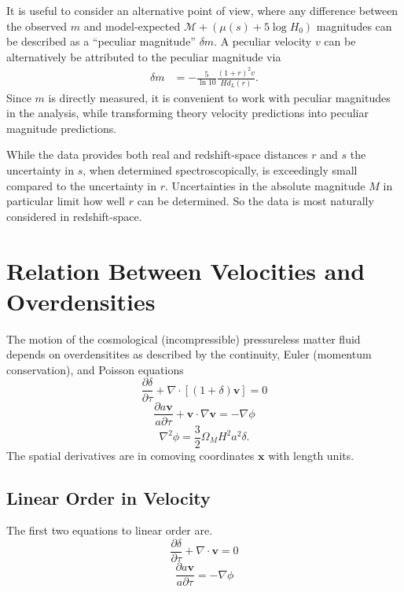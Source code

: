 \documentclass[11pt, oneside]{article}   	%
\begin{document}
It is useful to consider an alternative point of view, where 
any difference between the observed $m$ and model-expected $\mathcal{M} + (\mu(s)+5\log{H_0})$ magnitudes
can be described as
a ``peculiar magnitude''  $\delta m$.  A peculiar velocity $v$ can be alternatively be attributed to 
the peculiar magnitude via
\begin{align}
\delta m & = -\frac{5}{\ln{10}}\frac{(1+r)^2v}{Hd_L(r)}. 
\end{align}
Since $m$ is directly measured, it is convenient to work with
peculiar magnitudes in the analysis, while transforming theory velocity predictions into peculiar magnitude predictions.


While the data provides both real and redshift-space distances $r$ and $s$ the uncertainty in
$s$, when determined spectroscopically, is exceedingly small compared to the uncertainty in $r$.
Uncertainties in the absolute magnitude  $M$ in particular limit how well $r$ can be
determined.  So the data is most naturally considered in redshift-space.

\section{Relation Between Velocities and Overdensities}
\label{fluid:sec}
The motion of the cosmological (incompressible) pressureless matter
fluid depends on overdensitites as described by the continuity, Euler
(momentum conservation), and Poisson equations
\begin{equation}
\frac{\partial \delta}{\partial \tau} + \nabla \cdot [(1+\delta)\mathbf{v}]=0
\end{equation}
\begin{equation}
\frac{\partial a \mathbf{v}}{a\partial \tau} + \mathbf{v} \cdot \nabla \mathbf{v} = - \nabla \phi
\end{equation}
\begin{equation}
\nabla^2\phi=\frac{3}{2} \Omega_MH^2a^2\delta.
\end{equation}
The spatial derivatives are in comoving coordinates  $\mathbf{x}$ with length units.

\subsection{Linear Order in Velocity}
The first two  equations to linear order are.
\begin{equation}
\frac{\partial \delta}{\partial \tau} + \nabla \cdot \mathbf{v}=0
\end{equation}
\begin{equation}
\frac{\partial a \mathbf{v}}{a\partial \tau} = - \nabla \phi
\end{equation}
\end{document}
